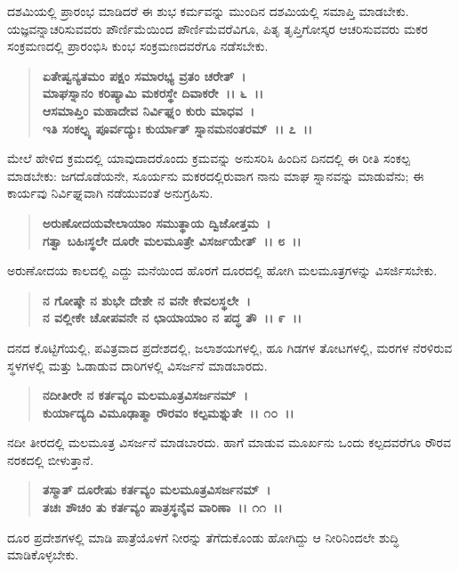 ದಶಮಿಯಲ್ಲಿ ಪ್ರಾರಂಭ ಮಾಡಿದರೆ ಈ ಶುಭ ಕರ್ಮವನ್ನು ಮುಂದಿನ ದಶಮಿಯಲ್ಲಿ ಸಮಾಪ್ತಿ ಮಾಡಬೇಕು. ಯಜ್ಞವನ್ನಾಚರಿಸುವವರು ಪೌರ್ಣಿಮೆಯಿಂದ ಪೌರ್ಣಿಮೆವರೆವಿಗೂ, ಪಿತೃ ತೃಪ್ತಿಗೋಸ್ಕರ ಆಚರಿಸುವವರು ಮಕರ ಸಂಕ್ರಮಣದಲ್ಲಿ ಪ್ರಾರಂಭಿಸಿ ಕುಂಭ ಸಂಕ್ರಮಣದವರೆಗೂ ನಡೆಸಬೇಕು.

\begin{verse}
\textbf{ಏತೇಷ್ವನ್ಯತಮಂ ಪಕ್ಷಂ ಸಮಾರಭ್ಯ ವ್ರತಂ ಚರೇತ್~।}\\\textbf{ಮಾಘಸ್ನಾನಂ ಕರಿಷ್ಯಾಮಿ ಮಕರಸ್ಥೇ ದಿವಾಕರೇ~।। ೬~।।}\\\textbf{ಆಸಮಾಪ್ತಿಂ ಮಹಾದೇವ ನಿರ್ವಿಘ್ನಂ ಕುರು ಮಾಧವ~।}\\\textbf{ಇತಿ ಸಂಕಲ್ಪ್ಯ ಪೂರ್ವದ್ಯುಃ ಕುರ್ಯಾತ್ ಸ್ನಾನಮನಂತರಮ್~।। ೭~।।}
\end{verse}

ಮೇಲೆ ಹೇಳಿದ ಕ್ರಮದಲ್ಲಿ ಯಾವುದಾದರೊಂದು ಕ್ರಮವನ್ನು ಅನುಸರಿಸಿ ಹಿಂದಿನ ದಿನದಲ್ಲಿ ಈ ರೀತಿ ಸಂಕಲ್ಪ ಮಾಡಬೇಕು: ಜಗದೊಡೆಯನೇ, ಸೂರ್ಯನು ಮಕರದಲ್ಲಿರುವಾಗ ನಾನು ಮಾಘ ಸ್ನಾನವನ್ನು ಮಾಡುವೆನು; ಈ ಕಾರ್ಯವು ನಿರ್ವಿಘ್ನವಾಗಿ ನಡೆಯುವಂತೆ ಅನುಗ್ರಹಿಸು.

\begin{verse}
\textbf{ಅರುಣೋದಯವೇಲಾಯಾಂ ಸಮುತ್ಥಾಯ ದ್ವಿಜೋತ್ತಮ~।}\\\textbf{ಗತ್ವಾ ಬಹಿಃಸ್ಥಲೇ ದೂರೇ ಮಲಮೂತ್ರೇ ವಿಸರ್ಜಯೇತ್~।। ೮~।।}
\end{verse}

ಅರುಣೋದಯ ಕಾಲದಲ್ಲಿ ಎದ್ದು ಮನೆಯಿಂದ ಹೊರಗೆ ದೂರದಲ್ಲಿ ಹೋಗಿ ಮಲಮೂತ್ರಗಳನ್ನು ವಿಸರ್ಜಿಸಬೇಕು.

\begin{verse}
\textbf{ನ ಗೋಷ್ಠೇ ನ ಶುಭೇ ದೇಶೇ ನ ವನೇ ಕೇವಲಸ್ಥಲೇ~।}\\\textbf{ನ ವಲ್ಲೀಕೇ ಚೋಪವನೇ ನ ಛಾಯಾಯಾಂ ನ ಪದ್ಧ ತೌ~।। ೯~।।}
\end{verse}

ದನದ ಕೊಟ್ಟಿಗೆಯಲ್ಲಿ, ಪವಿತ್ರವಾದ ಪ್ರದೇಶದಲ್ಲಿ, ಜಲಾಶಯಗಳಲ್ಲಿ, ಹೂ ಗಿಡಗಳ ತೋಟಗಳಲ್ಲಿ, ಮರಗಳ ನೆರಳಿರುವ ಸ್ಥಳಗಳಲ್ಲಿ ಮತ್ತು ಓಡಾಡುವ ದಾರಿಗಳಲ್ಲಿ ವಿಸರ್ಜನೆ ಮಾಡಬಾರದು.

\begin{verse}
\textbf{ನದೀತೀರೇ ನ ಕರ್ತವ್ಯಂ ಮಲಮೂತ್ರವಿಸರ್ಜನಮ್~।}\\\textbf{ಕುರ್ಯಾದ್ಯದಿ ವಿಮೂಢಾತ್ಮಾ ರೌರವಂ ಕಲ್ಪಮಶ್ನುತೇ~।। ೧೦~।।}
\end{verse}

ನದೀ ತೀರದಲ್ಲಿ ಮಲಮೂತ್ರ ವಿಸರ್ಜನೆ ಮಾಡಬಾರದು. ಹಾಗೆ ಮಾಡುವ ಮೂರ್ಖನು ಒಂದು ಕಲ್ಪದವರೆಗೂ ರೌರವ ನರಕದಲ್ಲಿ ಬೀಳುತ್ತಾನೆ.

\begin{verse}
\textbf{ತಸ್ಮಾತ್ ದೂರೇಷು ಕರ್ತವ್ಯಂ ಮಲಮೂತ್ರವಿಸರ್ಜನಮ್~।}\\\textbf{ತಚಃ ಶೌಚಂ ತು ಕರ್ತವ್ಯಂ ಪಾತ್ರಸ್ಥನೈವ ವಾರಿಣಾ~।। ೧೧~।।}
\end{verse}

ದೂರ ಪ್ರದೇಶಗಳಲ್ಲಿ ಮಾಡಿ ಪಾತ್ರೆಯೊಳಗೆ ನೀರನ್ನು ತೆಗೆದುಕೊಂಡು ಹೋಗಿದ್ದು ಆ ನೀರಿನಿಂದಲೇ ಶುದ್ಧಿ ಮಾಡಿಕೊಳ್ಳಬೇಕು.

